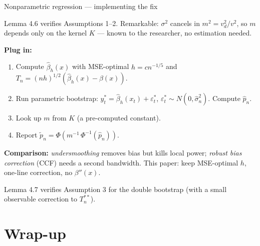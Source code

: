 \documentclass[10pt,aspectratio=169]{beamer}
\theoremstyle{plain}
\newcommand{\Tn}{T_{n}}
\newcommand{\Tnss}{T_{n}^{**}}
\newcommand{\pnh}{\hat{p}_{n}}
\newcommand{\pnt}{\tilde{p}_{n}}
\begin{document}
\begin{frame}{Nonparametric regression --- implementing the fix}

  Lemma 4.6 verifies Assumptions 1--2. Remarkable: $\sigma^2$ cancels in
  $m^2 = v_d^2/v^2$, so $m$ depends \alert{only on the kernel $K$} --- known
  to the researcher, no estimation needed.

  \bigskip

  \textbf{Plug in:}
  \begin{enumerate}
    \setlength{\itemsep}{6pt}
    \item Compute $\hat\beta_h(x)$ with MSE-optimal $h = cn^{-1/5}$
      and $\Tn = (nh)^{1/2}(\hat\beta_h(x) - \beta(x))$.
    \item Run parametric bootstrap: $y_t^* = \hat\beta_h(x_t) + \varepsilon_t^*$,
      $\varepsilon_t^* \sim N(0, \hat\sigma_n^2)$.
      Compute $\pnh$.
    \item Look up $m$ from $K$ (a pre-computed constant).
    \item Report $\pnt = \Phi(m^{-1}\,\Phi^{-1}(\pnh))$.
  \end{enumerate}

  \bigskip

  \textbf{Comparison:}
  \textit{undersmoothing} removes bias but kills local power;
  \textit{robust bias correction} (CCF) needs a second bandwidth.
  This paper: keep MSE-optimal $h$, one-line correction, no $\beta''(x)$.

  \medskip

  \footnotesize
  Lemma 4.7 verifies Assumption 3 for the double bootstrap (with a small
  observable correction to $\Tnss$).

\end{frame}

\section{Wrap-up}
\end{document}
